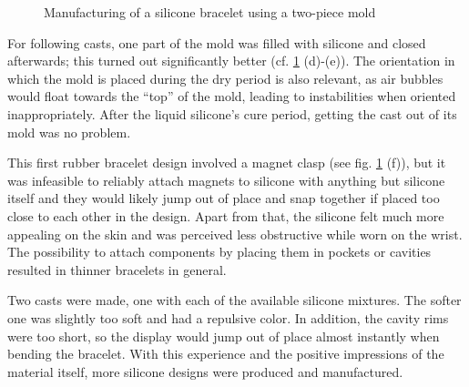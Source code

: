 \begin{figure}[bth]
	\caption{Manufacturing of a silicone bracelet using a two-piece mold}
	\label{fig:silicone01}
\end{figure}

For following casts, one part of the mold was filled with silicone and closed afterwards; this turned out significantly better (cf. \ref{fig:silicone01} (d)-(e)). The orientation in which the mold is placed during the dry period is also relevant, as air bubbles would float towards the ``top'' of the mold, leading to instabilities when oriented inappropriately. After the liquid silicone's cure period, getting the cast out of its mold was no problem.

This first rubber bracelet design involved a magnet clasp (see fig. \ref{fig:silicone01} (f)), but it was infeasible to reliably attach magnets to silicone with anything but silicone itself and they would likely jump out of place and snap together if placed too close to each other in the design. Apart from that, the silicone felt much more appealing on the skin and was perceived less obstructive while worn on the wrist. The possibility to attach components by placing them in pockets or cavities resulted in thinner bracelets in general.

Two casts were made, one with each of the available silicone mixtures. The softer one was slightly too soft and had a repulsive color. In addition, the cavity rims were too short, so the display would jump out of place almost instantly when bending the bracelet. With this experience and the positive impressions of the material itself, more silicone designs were produced and manufactured.

